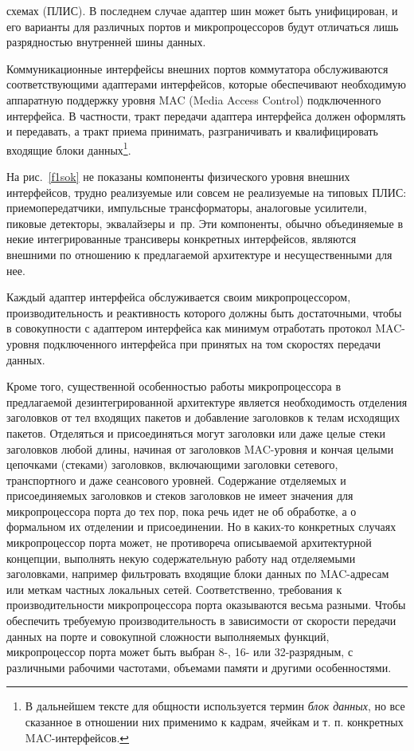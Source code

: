 \begin{multicols}{2}


\noindent
схемах (ПЛИС). В последнем случае адаптер шин может
быть унифицирован, и
его варианты для различных портов и микропроцессоров будут отличаться лишь разрядностью
внутренней шины данных.

Коммуникационные интерфейсы внешних портов коммутатора обслуживаются
соответствующими адаптерами интерфейсов, которые обеспечивают необходимую аппаратную
поддержку уровня MAC (Media Access Control) подключенного интерфейса. В част\-ности, тракт передачи адаптера
интерфейса должен оформлять и передавать, а тракт приема принимать, разграничивать и
квалифицировать входящие блоки данных\footnote{В дальнейшем тексте для общности используется
термин \textit{блок данных}, но все сказанное в отношении них применимо к кадрам, ячейкам и т. п. конкретных
MAC-интерфейсов.}. 

На рис.~\ref{f1sok} не показаны компоненты физического уровня внешних
интерфейсов, трудно реализуемые или совсем не реализуемые на типовых ПЛИС:
приемопередатчики, импульсные трансформаторы, аналоговые усилители, пиковые детекторы,
эквалайзеры и~пр. Эти компоненты, обычно объединяемые в некие интегрированные
трансиверы конкретных интерфейсов, являются внешними по отношению к предлагаемой
архитектуре и несущественными для нее.

    Каждый адаптер интерфейса обслуживается своим микропроцессором, производительность
и реактивность которого должны быть достаточными, чтобы в совокупности с адаптером
интерфейса как минимум отработать протокол MAC-уровня подключенного интерфейса при
принятых на том скоростях передачи данных. 

Кроме того, существенной особенностью работы
микропроцессора в предлагаемой дезинтегрированной архитектуре является необходимость
отделе\-ния заголовков от тел входящих пакетов и %
 до\-бав\-ле\-ние заголовков к телам исходящих
пакетов. Отделяться и присоединяться могут заголовки или даже целые стеки заголовков любой
длины, начиная от заголовков MAC-уров\-ня и кончая целыми цепочками (стеками) заголовков,
включающими заголовки сетевого, транспортного и даже сеансового уровней. Содержание
отделяемых и присоединяемых заголовков и стеков заголовков не имеет значения для
микропроцессора порта до тех пор, пока речь идет не об обработке, а о формальном их
отделении и присоединении. Но в каких-то конкретных случаях микропроцессор порта может,
не противореча описываемой архитектурной концепции, выполнять некую содержательную
работу над отделяемыми заголовками, например фильтровать входящие блоки данных по 
MAC-ад\-ре\-сам или меткам частных локальных сетей. Соответственно, требования к
производительности микропроцессора порта оказываются весьма разными. Чтобы обеспечить
требуемую производительность в %
 зави\-си\-мости от скорости передачи данных на порте и
совокупной сложности выполняемых функций, микропроцессор порта может быть выбран 8-,
16- или 32-раз\-ряд\-ным, с различными рабочими час\-то\-та\-ми, объемами памяти и другими
особен\-но\-стями. 
{

}
\end{multicols}
